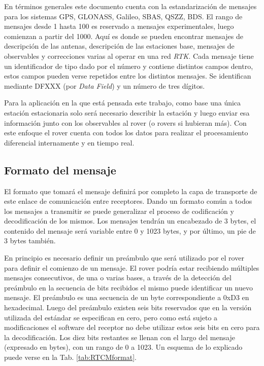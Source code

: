 \documentclass[a4paper,12pt,oneside,onecolumn,final,openright]{book}%
\begin{document}
	En términos generales este documento cuenta con la estandarización de mensajes para los sistemas GPS, GLONASS, Galileo, SBAS, QSZZ, BDS. El rango de mensajes desde 1 hasta 100 es reservado a mensajes experimentales, luego comienzan a partir del 1000. Aquí es donde se pueden encontrar mensajes de descripción de las antenas, descripción de las estaciones base, mensajes de observables y correcciones varias al operar en una red \textit{RTK}. Cada mensaje tiene un identificador de tipo dado por el número y contiene distintos campos dentro, estos campos pueden verse repetidos entre los distintos mensajes. Se identifican mediante DFXXX (por \textit{Data Field}) y un número de tres dígitos. 
	
	Para la aplicación en la que está pensada este trabajo, como base una única estación estacionaria solo será necesario describir la estación y luego enviar esa información junto con los observables al rover (o rovers si hubieran más). Con este enfoque el rover cuenta con todos los datos para realizar el procesamiento diferencial internamente y en tiempo real.
\subsection{Formato del mensaje}\label{sec:RTCM_format}
	El formato que tomará el mensaje definirá por completo la capa de transporte de este enlace de comunicación entre receptores. Dando un formato común a todos los mensajes a transmitir se puede generalizar el proceso de codificación y decodificación de los mismos. Los mensajes tendrán un encabezado de 3 bytes, el contenido del mensaje será variable entre 0 y 1023 bytes, y por último, un pie de 3 bytes también.
	
	En principio es necesario definir un preámbulo que será utilizado por el rover para definir el comienzo de un mensaje. El rover podría estar recibiendo múltiples mensajes consecutivos, de una o varias bases, a través de la detección del preámbulo en la secuencia de bits recibidos el mismo puede identificar un nuevo mensaje. El preámbulo es una secuencia de un byte correspondiente a 0xD3 en hexadecimal. Luego del preámbulo existen seis bits reservados que en la versión utilizada del estándar se especifican en cero, pero como está sujeto a modificaciones el software del receptor no debe utilizar estos seis bits en cero para la decodificación. Los diez bits restantes se llenan con el largo del mensaje (expresado en bytes), con un rango de 0 a 1023. Un esquema de lo explicado puede verse en la Tab. \ref{tab:RTCMformat}.
	
\end{document}
